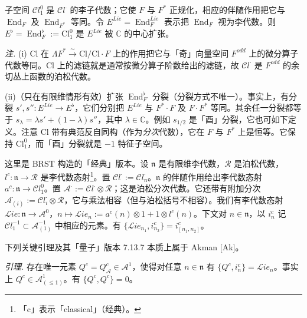 子空间 $\mathcal{C}l^{0}_1$ 是 $\mathcal{C}l^{\cdot}$ 的李子代数；它使 $F$ 与 $F^{*}$ 正规化，相应的伴随作用把它与 $\operatorname{End}_F$ 及 $\operatorname{End}_{F^{*}}$ 等同。令 $E^{Lie}=\operatorname{End}^{Lie}_F$ 表示把 $\operatorname{End}_F$ 视为李代数。则 $E^{\flat}=\operatorname{End}^{\flat}_F:=\mathrm{Cl}^{0}_1$ 是 $E^{Lie}$ 被 $\mathbb{C}$ 的中心扩张。

\emph{注.} (i) $\mathrm{Cl}$ 在 $\Lambda F^{*}\xrightarrow{\sim}\mathrm{Cl}/\mathrm{Cl}\cdot F$ 上的作用把它与「奇」向量空间 $F^{odd}$ 上的微分算子代数等同。$\mathrm{Cl}$ 上的滤链就是通常按微分算子阶数给出的滤链，故 $\mathcal{C}l^{\cdot}$ 是 $F^{odd}$ 的余切丛上函数的泊松代数。

(ii)（只在有限维情形有效）扩张 $\operatorname{End}^{\flat}_F$ 分裂（分裂方式不唯一）。事实上，有分裂 $s',s'':E^{Lie}\to E^{\flat}$，它们分别把 $E^{Lie}$ 与 $F^{*}\cdot F$ 及 $F\cdot F^{*}$ 等同。其余任一分裂都等于 $s_{\lambda}=\lambda s'+(1-\lambda)s''$，其中 $\lambda\in\mathbb{C}$。例如 $s_{1/2}$ 是「酉」分裂，它也可如下定义。注意 $\mathrm{Cl}$ 带有典范反自同构（作为\emph{分次}代数），它在 $F$ 与 $F^{*}$ 上是恒等。它保持 $\mathrm{Cl}^{0}_1$，而「酉」分裂就是 $-1$ 特征子空间。

 这里是 BRST 构造的「经典」版本。设 $\mathfrak{n}$ 是有限维李代数，$\mathcal{R}$ 是泊松代数，$l^{c}:\mathfrak{n}\to\mathcal{R}$ 是李代数态射\footnote{「c」表示「classical」（经典）。}。置 $\mathcal{C}l^{\cdot}:=\mathcal{C}l^{\cdot}_{\mathfrak{n}}$。$\mathfrak{n}$ 的伴随作用给出李代数态射 $a^{c}:\mathfrak{n}\to\mathcal{C}l^{0}_1$。置 $\mathcal{A}^{\cdot}:=\mathcal{C}l^{\cdot}\otimes\mathcal{R}$；这是泊松分次代数。它还带有附加分次 $\mathcal{A}^{\cdot}_{(i)}:=\mathcal{C}l^{\cdot}_i\otimes\mathcal{R}$，它与乘法相容（但与泊松括号不相容）。我们有李代数态射 $\mathcal{L}ie:\mathfrak{n}\to\mathcal{A}^{0}$，$n\mapsto\mathcal{L}ie_n:=a^{c}(n)\otimes 1+1\otimes l^{c}(n)$。下文对 $n\in\mathfrak{n}$，以 $i^{c}_n$ 记 $\mathcal{C}l^{-1}_1\subset\mathcal{A}^{-1}_{(1)}$ 中相应的元素。有 $\{\mathcal{L}ie_{n_1},i^{c}_{n_2}\}=i^{c}_{[n_1,n_2]}$。


下列关键引理及其「量子」版本 7.13.7 本质上属于 Akman [Ak]。

 \emph{引理.} 存在唯一元素 $Q^{c}=Q^{c}_{\mathcal{A}}\in\mathcal{A}^{1}$，使得对任意 $n\in\mathfrak{n}$ 有 $\{Q^{c},i^{c}_n\}=\mathcal{L}ie_n$。事实上 $Q^{c}\in\mathcal{A}^{1}_{(\le1)}$。有 $\{Q^{c},Q^{c}\}=0$。

